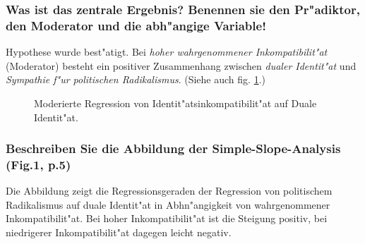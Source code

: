 \subsubsection{Was ist das zentrale Ergebnis? Benennen sie den Pr"adiktor, den Moderator und die abh"angige Variable!}
Hypothese wurde best"atigt. Bei \emph{hoher wahrgenommener Inkompatibilit"at} (Moderator) besteht ein positiver Zusammenhang zwischen \emph{dualer Identit"at} und \emph{Sympathie f"ur politischen Radikalismus}. (Siehe auch fig. \ref{fig:simon1}.)

\begin{figure}[h!]
        \begin{center}
        \end{center}
        \caption{Moderierte Regression von Identit"atsinkompatibilit"at auf Duale Identit"at.}
        \label{fig:simon1}
\end{figure}

\subsubsection{Beschreiben Sie die Abbildung der Simple-Slope-Analysis (Fig.1, p.5)}
Die Abbildung zeigt die Regressionsgeraden der Regression von politischem Radikalismus auf duale Identit"at in Abhn"angigkeit von wahrgenommener Inkompatibilit"at. Bei hoher Inkompatibilit"at ist die Steigung positiv, bei niedrigerer Inkompatibilit"at dagegen leicht negativ.


